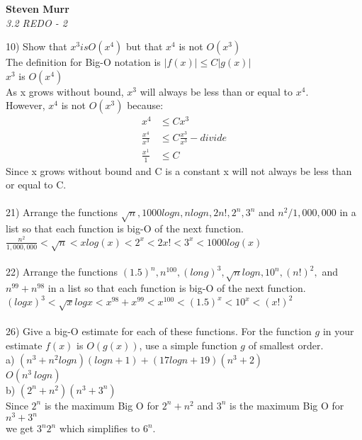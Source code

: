 \documentclass{article}
\begin{document}
\setcounter{totalnumber}{5}
   \begin{flushright}
      \Large\textbf{Steven Murr}\\
      \large\textit{3.2 REDO - 2} \\
   \end{flushright}
\begin{flushleft}
\makeatletter%
\setlength{\@fptop}{5pt}
\makeatother

\setlength\parindent{0pt}10) Show that $x^3 is O(x^4)$ but that $x^4$ is not $O(x^3)$ \\
\setlength\parindent{24pt} The definition for Big-O notation is $| f(x) | \leq C | g(x) |$ \\
\setlength\parindent{48pt} $x^3$ is $O(x^4)$ \\
As x grows without bound, $x^3$ will always be less than or equal to $x^4$. \\
However, $x^4$ is not $O(x^3)$ because: 
\begin{align*}
x^4 &\leq Cx^3 \\
\frac{x^4}{x^3} &\leq C\frac{x^3}{x^3} - divide \\
\frac{x^1}{1} &\leq C
\end{align*}
Since x grows without bound and C is a constant x will not always be less than or equal to C. \\
~\\
\setlength\parindent{0pt}21) Arrange the functions $\sqrt{n}, 1000logn, nlogn, 2n!, 2^n, 3^n$ and $n^2 / 1,000,000$ in a list so that each function is big-O of the next function. \\
\setlength\parindent{24pt} $\frac{n^2}{1,000,000} < \sqrt{n} < xlog(x) < 2^x < 2x! < 3^x < 1000log(x) $ \\
~\\
\setlength\parindent{0pt}22) Arrange the functions $(1.5)^n, n^{100}, (long)^3, \sqrt{n}logn, 10^n, (n!)^2, $ and $n^{99} + n^{98}$ in a list so that each function is big-O of the next function. \\
\setlength\parindent{24pt} $(logx)^3 < \sqrt{x} log x < x^{98} + x^{99} < x^{100} < (1.5)^x  < 10^x < (x!)^2$ \\
~\\
\setlength\parindent{0pt}26) Give a big-O estimate for each of these functions.  For the function $g$ in your estimate $f(x)$ is $O(g(x))$, use a simple function $g$ of smallest order. \\
\setlength\parindent{24pt}a) $(n^3 + n^2logn)(logn + 1) + (17logn+19)(n^3 + 2)$ \\
\setlength\parindent{48pt} $O(n^3\:logn)$ \\
\setlength\parindent{24pt}b) $(2^n + n^2)(n^3 + 3^n)$ \\
\setlength\parindent{48pt} Since $2^n$ is the maximum Big O for $2^n + n^2$ and $3^n$ is the maximum Big O for $n^3 + 3^n$ \\we get $3^n2^n$ which simplifies to $6^n$.







\end{flushleft}
\end{document}
